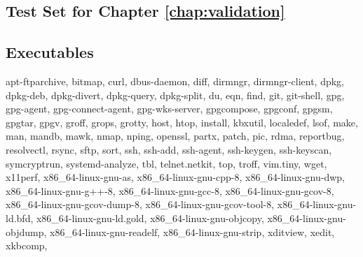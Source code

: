 \documentclass[
    12pt,                               %
    DIV=14,                     %
    parskip=half+,              %
    bigheadings,                %
    cleardoubleempty,   %
    halfparskip,                %
    ]{scrreprt} %
\begin{document}
\begin{appendices}
\chapter{Test Set for Chapter \ref{chap:validation}} \label{appendix:testset}
\section{Executables}
\begin{sloppypar}
{\scriptsize
apt-ftparchive, bitmap, curl, dbus-daemon, diff, dirmngr, dirmngr-client, dpkg, dpkg-deb, dpkg-divert, dpkg-query, dpkg-split, du, eqn, find, git, git-shell, gpg, gpg-agent, gpg-connect-agent, gpg-wks-server, gpgcompose, gpgconf, gpgsm, gpgtar, gpgv, groff, grops, grotty, host, htop, install, kbxutil, localedef, lsof, make, man, mandb, mawk, nmap, nping, openssl, partx, patch, pic, rdma, reportbug, resolvectl, rsync, sftp, sort, ssh, ssh-add, ssh-agent, ssh-keygen, ssh-keyscan, symcryptrun, systemd-analyze, tbl, telnet.netkit, top, troff, vim.tiny, wget, x11perf, x86\_64-linux-gnu-as, x86\_64-linux-gnu-cpp-8, x86\_64-linux-gnu-dwp, x86\_64-linux-gnu-g++-8, x86\_64-linux-gnu-gcc-8, x86\_64-linux-gnu-gcov-8, x86\_64-linux-gnu-gcov-dump-8, x86\_64-linux-gnu-gcov-tool-8, x86\_64-linux-gnu-ld.bfd, x86\_64-linux-gnu-ld.gold, x86\_64-linux-gnu-objcopy, x86\_64-linux-gnu-objdump, x86\_64-linux-gnu-readelf, x86\_64-linux-gnu-strip, xditview, xedit, xkbcomp,
}
\end{sloppypar}


\end{appendices}
\end{document}
